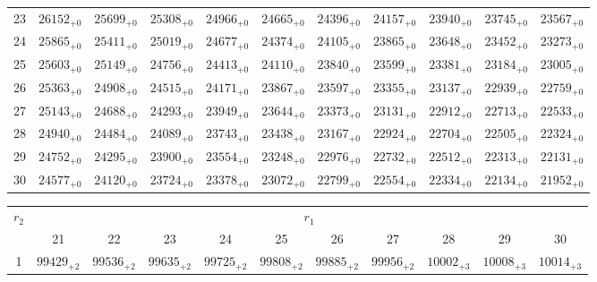 \documentclass[10pt, a4paper]{article}
\begin{document}
\begin{center}
\begin{tabular}{c || c c c c c | c c c c c}
        23 & \({26152}_{+0}\) & \({25699}_{+0}\) & \({25308}_{+0}\) & \({24966}_{+0}\) & \({24665}_{+0}\) & \({24396}_{+0}\) & \({24157}_{+0}\) & \({23940}_{+0}\) & \({23745}_{+0}\) & \({23567}_{+0}\)\\
        24 & \({25865}_{+0}\) & \({25411}_{+0}\) & \({25019}_{+0}\) & \({24677}_{+0}\) & \({24374}_{+0}\) & \({24105}_{+0}\) & \({23865}_{+0}\) & \({23648}_{+0}\) & \({23452}_{+0}\) & \({23273}_{+0}\)\\
        25 & \({25603}_{+0}\) & \({25149}_{+0}\) & \({24756}_{+0}\) & \({24413}_{+0}\) & \({24110}_{+0}\) & \({23840}_{+0}\) & \({23599}_{+0}\) & \({23381}_{+0}\) & \({23184}_{+0}\) & \({23005}_{+0}\)\\
        \hline
        26 & \({25363}_{+0}\) & \({24908}_{+0}\) & \({24515}_{+0}\) & \({24171}_{+0}\) & \({23867}_{+0}\) & \({23597}_{+0}\) & \({23355}_{+0}\) & \({23137}_{+0}\) & \({22939}_{+0}\) & \({22759}_{+0}\)\\
        27 & \({25143}_{+0}\) & \({24688}_{+0}\) & \({24293}_{+0}\) & \({23949}_{+0}\) & \({23644}_{+0}\) & \({23373}_{+0}\) & \({23131}_{+0}\) & \({22912}_{+0}\) & \({22713}_{+0}\) & \({22533}_{+0}\)\\
        28 & \({24940}_{+0}\) & \({24484}_{+0}\) & \({24089}_{+0}\) & \({23743}_{+0}\) & \({23438}_{+0}\) & \({23167}_{+0}\) & \({22924}_{+0}\) & \({22704}_{+0}\) & \({22505}_{+0}\) & \({22324}_{+0}\)\\
        29 & \({24752}_{+0}\) & \({24295}_{+0}\) & \({23900}_{+0}\) & \({23554}_{+0}\) & \({23248}_{+0}\) & \({22976}_{+0}\) & \({22732}_{+0}\) & \({22512}_{+0}\) & \({22313}_{+0}\) & \({22131}_{+0}\)\\
        30 & \({24577}_{+0}\) & \({24120}_{+0}\) & \({23724}_{+0}\) & \({23378}_{+0}\) & \({23072}_{+0}\) & \({22799}_{+0}\) & \({22554}_{+0}\) & \({22334}_{+0}\) & \({22134}_{+0}\) & \({21952}_{+0}\)\\
        \hline
    \end{tabular}
    \pagebreak
    \begin{tabular}{c || c c c c c | c c c c c}
        \multirow{2}{*}{\(r_2\)} & \multicolumn{10}{c}{\(r_1\)} \\
        & 21 & 22 & 23 & 24 & 25 & 26 & 27 & 28 & 29 & 30\\
        \hline\hline
        1 & \({99429}_{+2}\) & \({99536}_{+2}\) & \({99635}_{+2}\) & \({99725}_{+2}\) & \({99808}_{+2}\) & \({99885}_{+2}\) & \({99956}_{+2}\) & \({10002}_{+3}\) & \({10008}_{+3}\) & \({10014}_{+3}\)\\

\end{tabular}
\end{center}
\end{document}
